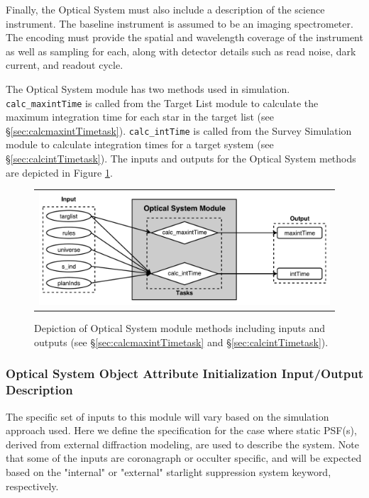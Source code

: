 \documentclass[cleanfoot]{asme2ej}
\newcommand{\reffig}[1]{Figure \ref{#1}}
\begin{document}
Finally, the Optical System must also include a description of the science instrument.  The baseline instrument is assumed to be an imaging spectrometer.  The encoding must provide the spatial and wavelength coverage of the instrument as well as sampling for each, along with detector details such as read noise, dark current, and readout cycle.

The Optical System module has two methods used in simulation.  \verb+calc_maxintTime+ is called from the Target List module to calculate the maximum integration time for each star in the target list (see \S\ref{sec:calcmaxintTimetask}).  \verb+calc_intTime+ is called from the Survey Simulation module to calculate integration times for a target system (see \S\ref{sec:calcintTimetask}).  The inputs and outputs for the Optical System methods are depicted in \reffig{fig:opticalsysmodule}.

\begin{figure}[ht]
    \begin{center}
        \begin{tabular}{c}
             \includegraphics[width=\textwidth]{OpticalSysTasks}
        \end{tabular}
    \end{center}
    \caption{\label{fig:opticalsysmodule} Depiction of Optical System module methods including inputs and outputs (see \S\ref{sec:calcmaxintTimetask} and \S\ref{sec:calcintTimetask}).}
\end{figure}


\label{sec:opticalsystem}
\subsubsection{Optical System Object Attribute Initialization Input/Output Description} 

The specific set of inputs to this module will vary based on the simulation approach used.  Here we define the specification for the case where static PSF(s), derived from external diffraction modeling, are used to describe the system.  Note that some of the inputs are coronagraph or occulter specific, and will be expected based on the "internal" or "external" starlight suppression system keyword, respectively.
\end{document}
